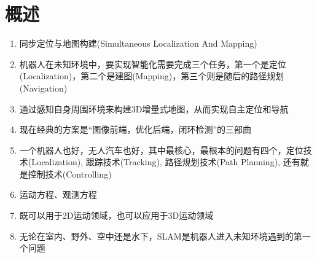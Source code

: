 \chapter{概述}

\begin{enumerate}
\item 同步定位与地图构建(Simultaneous Localization And Mapping)
\item 机器人在未知环境中，要实现智能化需要完成三个任务，第一个是定位(Localization)，第二个是建图(Mapping)，第三个则是随后的路径规划(Navigation)
\item 通过感知自身周围环境来构建3D增量式地图，从而实现自主定位和导航
\item 现在经典的方案是“图像前端，优化后端，闭环检测”的三部曲
\item 一个机器人也好，无人汽车也好，其中最核心，最根本的问题有四个，定位技术(Localization), 跟踪技术(Tracking), 路径规划技术(Path Planning), 还有就是控制技术(Controlling)
\item 运动方程、观测方程
\item 既可以用于2D运动领域，也可以应用于3D运动领域
\item 无论在室内、野外、空中还是水下，SLAM是机器人进入未知环境遇到的第一个问题
\end{enumerate}